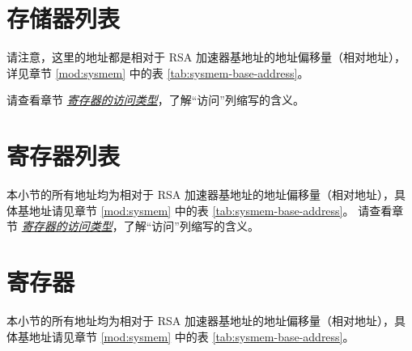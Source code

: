 \documentclass[main\_\_CN.tex]{subfiles}
\begin{document}
\section{存储器列表 }\label{sec:mem-sum}
请注意，这里的地址都是相对于 RSA 加速器基地址的地址偏移量（相对地址），详见章节 \ref{mod:sysmem} \textit{} 中的表 \ref{tab:sysmem-base-address}。 

请查看章节 \hyperref[glossary-access-types]{\textit{寄存器的访问类型}}，了解“访问”列缩写的含义。



\hypertarget{rsa-reg-summ}{}
\section{寄存器列表}
\label{sec:rsa-reg-summ}


本小节的所有地址均为相对于 RSA 加速器基地址的地址偏移量（相对地址），具体基地址请见章节 \ref{mod:sysmem} \textit{} 中的表 \ref{tab:sysmem-base-address}。
请查看章节 \hyperref[glossary-access-types]{\textit{寄存器的访问类型}}，了解“访问”列缩写的含义。





\clearpage
\section{寄存器}

本小节的所有地址均为相对于 RSA 加速器基地址的地址偏移量（相对地址），具体基地址请见章节 \ref{mod:sysmem} \textit{} 中的表 \ref{tab:sysmem-base-address}。


\end{document}
